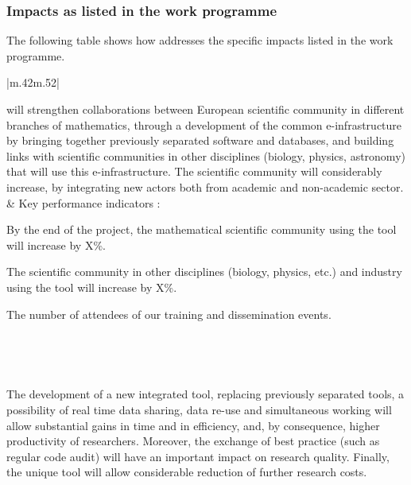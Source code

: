 \subsubsection{Impacts as listed in the work programme}

The following table shows how \TheProject  addresses the specific impacts
listed in the work programme.



\begin{supertabular}{|m{.42\textwidth}m{.52\textwidth}|}\hline\hline
{}\\\hline

  \TheProject will strengthen collaborations between European scientific community in
  different branches of mathematics, through a development of the common e-infrastructure
  by bringing together previously separated software and databases, and building links with
  scientific communities in other disciplines (biology, physics, astronomy) that will use
  this e-infrastructure. The scientific community will considerably increase, by
  integrating new actors both from academic and non-academic sector. 
& Key performance indicators :
  \begin{compactenum}
  \item By the end of the project, the mathematical scientific community using the tool
    will increase by X\%.
  \item The scientific community in other disciplines (biology, physics, etc.) 
  and industry using the tool will increase by X\%.
  \item The number of attendees of our training and dissemination events.
  \end{compactenum} \\\hline

  \hline{}\\\hline

  The development of a new integrated tool, replacing %
    previously separated tools, a possibility of real time data sharing, data re-use and
    simultaneous working will allow substantial gains in time and in efficiency, and, by
    consequence, higher productivity of researchers. Moreover, the exchange of best
    practice (such as regular code audit) will have an important impact on research
    quality. Finally, the unique tool will allow considerable reduction of further 
    research costs.


\end{supertabular}
